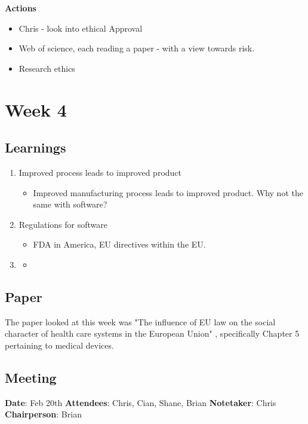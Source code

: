 \textbf{Actions}
\begin{itemize}
\item Chris - look into ethical Approval
\item Web of science, each reading a paper - with a view towards risk.
\item Research ethics
\end{itemize}

\chapter{Week 4}

\section{Learnings}
\begin{enumerate}
\item Improved process leads to improved product
\begin{itemize}
\item Improved manufacturing process leads to improved product. Why not the same with software?
\end{itemize}
\item Regulations for software
\begin{itemize}
\item FDA in America, EU directives within the EU.
\end{itemize}
\item
\begin{itemize}
\item
\end{itemize}
\end{enumerate}

\section{Paper}

The paper looked at this week was "The influence of EU law on the social character of health care systems in the European Union"  \parencite{week3}, specifically Chapter 5 pertaining to medical devices. 

\section{Meeting}

\textbf{Date}: Feb 20th\newline
\textbf{Attendees}: Chris, Cian, Shane, Brian\newline
\textbf{Notetaker}: Chris\newline
\textbf{Chairperson}: Brian\newline \newline

